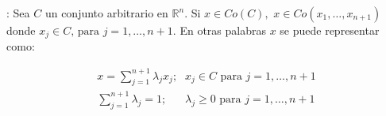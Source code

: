 {\teorema: Sea $C$ un conjunto arbitrario en $\mathbb{R}^n$. Si $x \in Co(C),\,\, x \in Co(x_1, \ldots , x_{n+1})$ donde
$x_j \in C,\,\mbox{para}\,\, j=1, \ldots , n+1.$ En otras palabras $x$ se puede representar como:

\begin{eqnarray*}
   x = \sum_{j=1}^{n+1} \lambda_j x_j\mbox{;} & x_j \in C\,\, \mbox{para}\,\, j=1, \ldots, n+1 \\  
   \sum_{j=1}^{n+1} \lambda_j = 1\mbox{;} & \lambda_j \geqslant 0 \,\,\mbox{para}\,\, j=1, \ldots, n+1
\end{eqnarray*}
\label{teo-carateodory} }
















